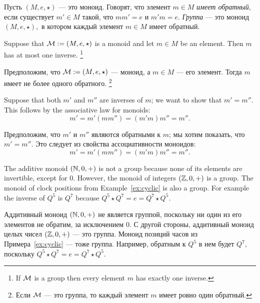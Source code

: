 \documentclass[../main/CT4S-EN-RU]{subfiles}
\begin{document}
\begin{definitionRUS}\label{def:group}
Пусть $(M,e,\star)$ — это моноид. Говорят, что элемент $m\in M$ {\em имеет обратный}, если существует $m'\in M$ такой, что $mm'=e$ и $m'm=e.$ {\em Группа} — это моноид $(M,e,\star),$ в котором каждый элемент $m\in M$ имеет обратный.
\end{definitionRUS}

\begin{propositionENG}
Suppose that $\mathcal{M}:=(M,e,\star)$ is a monoid and let $m\in M$ be an element. Then $m$ has at most one inverse.%
\footnote{If $\mathcal{M}$ is a group then every element $m$ has exactly one inverse.}
\end{propositionENG}

\begin{propositionRUS}
Предположим, что $\mathcal{M}:=(M,e,\star)$ — моноид, а $m\in M$ — его элемент. Тогда $m$ имеет не более одного обратного.%
\footnote{Если $\mathcal{M}$ — это группа, то каждый элемент $m$ имеет ровно один обратный.}
\end{propositionRUS}

\begin{proofENG}
Suppose that both $m'$ and $m''$ are inverses of $m$; we want to show that $m'=m''.$ This follows by the associative law for monoids:
$$m'=m'(mm'')=(m'm)m''=m''.$$
\end{proofENG}

\begin{proofRUS}
Предположим, что $m'$ и $m''$ являются обратными к $m$; мы хотим показать, что $m'=m''.$ Это следует из свойства ассоциативности моноидов:
$$m'=m'(mm'')=(m'm)m''=m''.$$
\end{proofRUS}

\begin{exampleENG}
The additive monoid $({\mathbb N},0,+)$ is not a group because none of its elements are invertible, except for $0.$ However, the monoid of integers $({\mathbb Z},0,+)$ is a group. The monoid of clock positions from Example~\ref{ex:cyclic} is also a group. For example the inverse of $Q^5$ is $Q^7$ because $Q^5\star Q^7=e=Q^7\star Q^5.$
\end{exampleENG}

\begin{exampleRUS}
Аддитивный моноид $({\mathbb N},0,+)$ не является группой, поскольку ни один из его элементов не обратим, за исключением $0.$ С другой стороны, аддитивный моноид целых чисел $({\mathbb Z},0,+)$ — это группа. Моноид позиций часов из Примера~\ref{ex:cyclic} — тоже группа. Например, обратным к $Q^5$ в нем будет $Q^7,$ поскольку $Q^5\star Q^7=e=Q^7\star Q^5.$
\end{exampleRUS}
\end{document}
